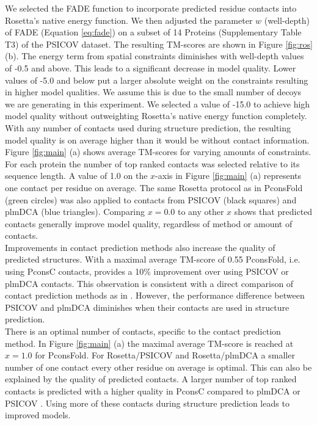 \documentclass{bioinfo}
\begin{document}
We selected the FADE function to incorporate predicted residue contacts into Rosetta's native energy function. We then adjusted the parameter $w$ (well-depth) of FADE (Equation \ref{eq:fade}) on a subset of 14 Proteins (Supplementary Table T3) of the PSICOV dataset. The resulting TM-scores are shown in Figure \ref{fig:ros} (b). The energy term from spatial constraints diminishes with well-depth values of -0.5 and above. This leads to a significant decrease in model quality. Lower values of -5.0 and below put a larger absolute weight on the constraints resulting in higher model qualities. We assume this is due to the small number of decoys we are generating in this experiment. We selected a value of -15.0 to achieve high model quality without outweighting Rosetta's native energy function completely.\\\indent
With any number of contacts used during structure prediction, the resulting model quality is on average higher than it would be without contact information. Figure \ref{fig:main} (a) shows average TM-scores for varying amounts of constraints. For each protein the number of top ranked contacts was selected relative to its sequence length. A value of 1.0 on the $x$-axis in Figure \ref{fig:main} (a) represents one contact per residue on average. The same Rosetta protocol as in PconsFold (green circles) was also applied to contacts from PSICOV (black squares) and plmDCA (blue triangles). Comparing $x=0.0$ to any other $x$ shows that predicted contacts generally improve model quality, regardless of method or amount of contacts. \\\indent
Improvements in contact prediction methods also increase the quality of predicted structures. With a maximal average TM-score of 0.55 PconsFold, i.e. using PconsC contacts, provides a 10\% improvement over using PSICOV or plmDCA contacts. This observation is consistent with a direct comparison of contact prediction methods as in \citeauthor{skwark_pconsc:_2013} \citeyear{skwark_pconsc:_2013}. However, the performance difference between PSICOV and plmDCA diminishes when their contacts are used in structure prediction. \\\indent
There is an optimal number of contacts, specific to the contact prediction method. In Figure \ref{fig:main} (a) the maximal average TM-score is reached at $x=1.0$ for PconsFold. For Rosetta/PSICOV and Rosetta/plmDCA a smaller number of one contact every other residue on average is optimal. This can also be explained by the quality of predicted contacts. A larger number of top ranked contacts is predicted with a higher quality in PconsC compared to plmDCA or PSICOV \cite[]{skwark_pconsc:_2013}. Using more of these contacts during structure prediction leads to improved models. \\\indent
\end{document}
